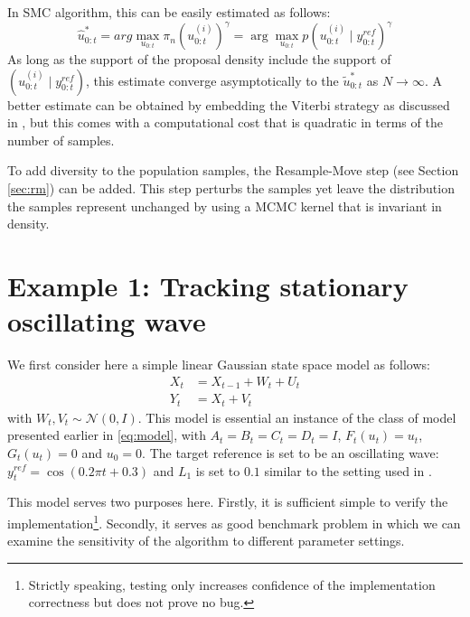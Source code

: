 In SMC algorithm, this can be easily estimated as follows:
\begin{equation}
\hat{u}^*_{0:t} = arg\max_{u_{0:t}} \pi_n(u^{(i)}_{0:t})^\gamma = \arg\max_{u_{0:t}} p(u^{(i)}_{0:t} \mid y^{ref}_{0:t})^\gamma
\end{equation}
As long as the support of the proposal density include the support of $(u^{(i)}_{0:t} \mid y^{ref}_{0:t})$, this estimate converge asymptotically to the $\tilde{u}^*_{0:t}$ as $N \to \infty$. A better estimate can be obtained by embedding the Viterbi strategy as discussed in \cite{SG01}, but this comes with a computational cost that is quadratic in terms of the number of samples.

To add diversity to the population samples, the Resample-Move step (see Section \ref{sec:rm}) can be added. This step perturbs the samples yet leave the distribution the samples represent unchanged by using a MCMC kernel that is invariant in density.

\section{Example 1: Tracking stationary oscillating wave}
\label{sec:exp1}
We first consider here a simple linear Gaussian state space model as follows:
\begin{align}
  X_t &= X_{t-1} + W_t + U_t \nonumber \\
  Y_t &= X_t + V_t
\label{eq:refnmodel}
\end{align}
with $W_t, V_t \sim \mathcal{N}(0,I)$. This model is essential an instance of the class of model presented earlier in \eqref{eq:model}, with $A_t=B_t=C_t=D_t=I$, $F_t(u_t)=u_t$, $G_t(u_t)=0$ and $u_0=0$. The target reference is set to be an oscillating wave: $y^{ref}_t = \cos(0.2 \pi t + 0.3)$ and $L_1$ is set to $0.1$ similar to the setting used in \cite{NK11}.

This model serves two purposes here. Firstly, it is sufficient simple to verify the implementation\footnote{Strictly speaking, testing only increases confidence of the implementation correctness but does not prove no bug.}. Secondly, it serves as good benchmark problem in which we can examine the sensitivity of the algorithm to different parameter settings.

